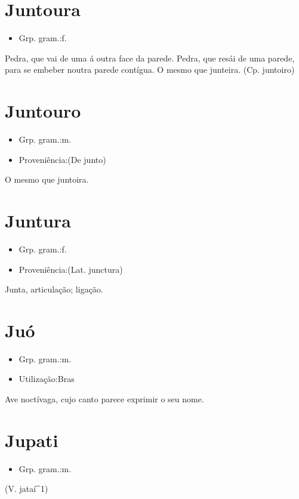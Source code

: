 \documentclass{article}
\begin{document}
\section{Juntoura}
\begin{itemize}
\item {Grp. gram.:f.}
\end{itemize}
Pedra, que vai de uma á outra face da parede.
Pedra, que resái de uma parede, para se embeber noutra parede contígua.
O mesmo que \textunderscore junteira\textunderscore .
(Cp. \textunderscore juntoiro\textunderscore )
\section{Juntouro}
\begin{itemize}
\item {Grp. gram.:m.}
\end{itemize}
\begin{itemize}
\item {Proveniência:(De \textunderscore junto\textunderscore )}
\end{itemize}
O mesmo que \textunderscore juntoira\textunderscore .
\section{Juntura}
\begin{itemize}
\item {Grp. gram.:f.}
\end{itemize}
\begin{itemize}
\item {Proveniência:(Lat. \textunderscore junctura\textunderscore )}
\end{itemize}
Junta, articulação; ligação.
\section{Juó}
\begin{itemize}
\item {Grp. gram.:m.}
\end{itemize}
\begin{itemize}
\item {Utilização:Bras}
\end{itemize}
Ave noctívaga, cujo canto parece exprimir o seu nome.
\section{Jupati}
\begin{itemize}
\item {Grp. gram.:m.}
\end{itemize}
(V. \textunderscore jataí\textunderscore ^1)
\end{document}
